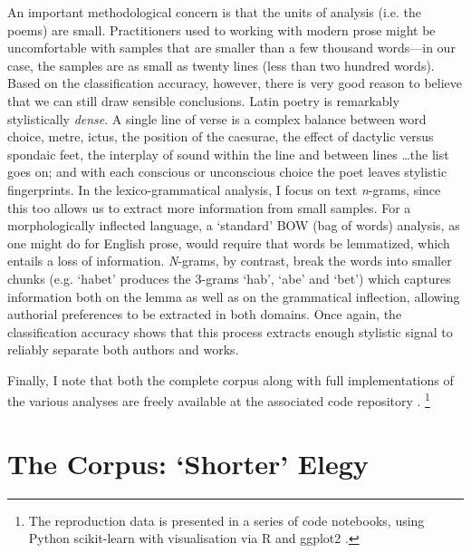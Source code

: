 \documentclass[twocolumn, switch, a4paper]{article} %
\begin{document}
An important methodological concern is that the units of analysis (i.e. the
poems) are small. Practitioners used to working with modern prose might be
uncomfortable with samples that are smaller than a few thousand words---in our
case, the samples are as small as twenty lines (less than two hundred words).
Based on the classification accuracy, however, there is very good reason to
believe that we can still draw sensible conclusions. Latin poetry is remarkably
stylistically \emph{dense}. A single line of verse is a complex balance between
word choice, metre, ictus, the position of the caesurae, the effect of dactylic
versus spondaic feet, the interplay of sound within the line and between lines
\dots the list goes on; and with each conscious or unconscious choice the poet
leaves stylistic fingerprints. In the lexico-grammatical analysis, I focus on
text \emph{n}-grams, since this too allows us to extract more information from
small samples. For a morphologically inflected language, a `standard' BOW (bag
of words) analysis, as one might do for English prose, would require that words
be lemmatized, which entails a loss of information. \emph{N}-grams, by contrast,
break the words into smaller chunks (e.g. `habet' produces the 3-grams `hab',
`abe' and `bet') which captures information both on the lemma as well as on the
grammatical inflection, allowing authorial preferences to be extracted in both
domains. Once again, the classification accuracy shows that this process
extracts enough stylistic signal to reliably separate both authors and works.

Finally, I note that both the complete corpus along with full implementations
of the various analyses are freely available at the associated code repository
\cite{nagy_heroides_2022}.%
%
    \footnote{The reproduction data is presented in a series of code
    notebooks, using Python scikit-learn \cite{scikit-learn} with
    visualisation via R and ggplot2 \cite{ggplot}.}
%
\section{The Corpus: `Shorter' Elegy}
\end{document}
